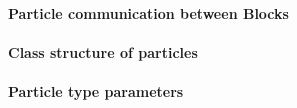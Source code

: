 \begin{frame}[fragile,label=ss-recent-particles] 
  \secframetitle{\ssRecentParticles}
  \framesubtitle{Particle communication between Blocks}
\end{frame}
%  
%
%

\begin{frame}[fragile,label=ss-recent-particles] 
  \secframetitle{\ssRecentParticles}
  \framesubtitle{Class structure of particles}

\end{frame}
%
%
% 
% 
% 
% 
% 
% 
% 		    

\begin{frame}[fragile,label=ss-recent-particles] 
  \secframetitle{\ssRecentParticles}
  \framesubtitle{Particle type parameters}
  
\end{frame}
%
%
%

